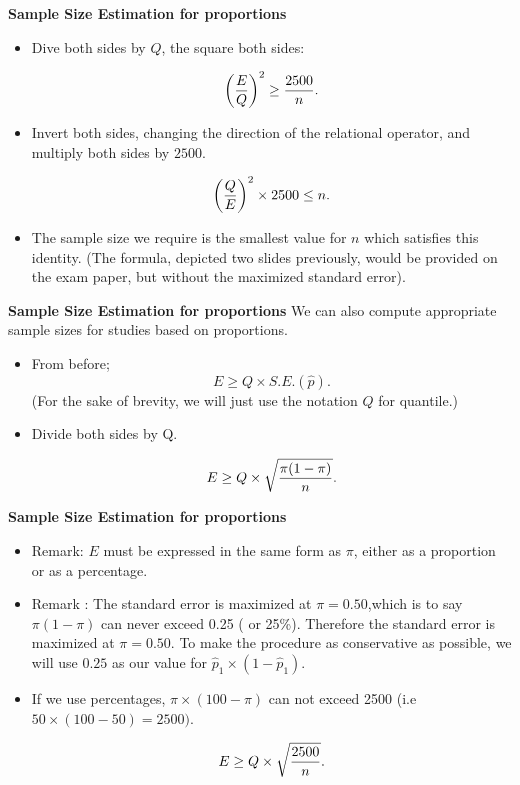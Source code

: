 \documentclass[]{report}
\begin{document}
\textbf{Sample Size Estimation for proportions}

\begin{itemize}

\item Dive both sides by $Q$, the square both sides:

\[ \left({E\over Q}\right)^2 \geq {2500 \over n}. \]

\item Invert both sides, changing the direction of the relational operator, and multiply both sides by $2500$.

\[ \left({Q\over E}\right)^2 \times 2500 \leq n. \]

\item The sample size we require is the smallest value for $n$ which satisfies this identity. (The formula,  depicted two slides previously, would be provided on the exam paper, but without the maximized standard error).
\end{itemize}








\textbf{Sample Size Estimation for proportions}
We can also compute appropriate sample sizes for studies based on proportions.
\begin{itemize}
\item From before; \[ E \geq Q \times S.E.(\hat{p}). \]
(For the sake of brevity, we will just use the notation $Q$ for quantile.)

\item Divide both sides by Q.

\[ E \geq Q \times \sqrt{ {\pi(1-\pi)  \over n} }. \]

\end{itemize}



\textbf{Sample Size Estimation for proportions}
\begin{itemize}
\item Remark: $E$ must be expressed in the same form as $\pi$, either as a proportion or as a percentage.
\item Remark : The standard error is maximized at $\pi = 0.50$,which is to say $\pi(1-\pi)$ can never exceed 0.25 ( or 25\%). Therefore the standard error is maximized at $\pi = 0.50$. To make the procedure as conservative as possible, we will use $0.25$ as our value for $\hat{p}_1 \times (1 - \hat{p}_1)$.
\item If we use percentages, $\pi \times (100-\pi)$ can not exceed 2500 (i.e $ 50 \times (100-50)=2500)$.

\[ E \geq Q \times \sqrt{{2500 \over n}}. \]


\end{itemize}
\end{document}
